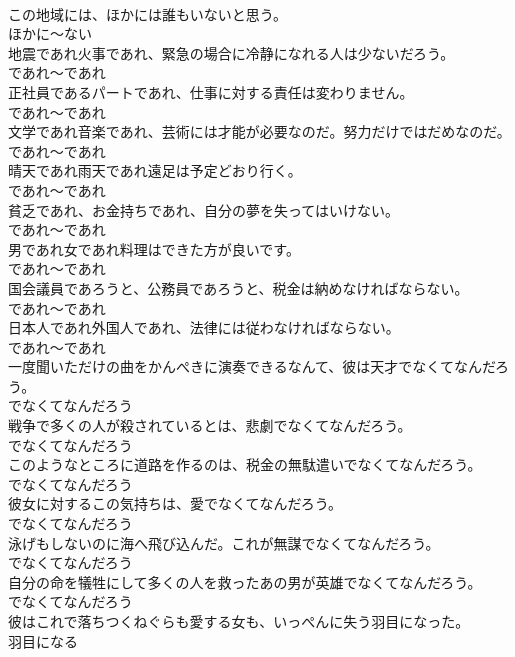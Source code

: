 \documentclass[8pt]{extreport}
\begin{document}
\begin{CJK}{UTF8}{min}
\\	この地域には、ほかには誰もいないと思う。	
\\	ほかに～ない
\\	地震であれ火事であれ、緊急の場合に冷静になれる人は少ないだろう。	
\\	であれ～であれ
\\	正社員であるパートであれ、仕事に対する責任は変わりません。	
\\	であれ～であれ
\\	文学であれ音楽であれ、芸術には才能が必要なのだ。努力だけではだめなのだ。	
\\	であれ～であれ
\\	晴天であれ雨天であれ遠足は予定どおり行く。	
\\	であれ～であれ
\\	貧乏であれ、お金持ちであれ、自分の夢を失ってはいけない。	
\\	であれ～であれ
\\	男であれ女であれ料理はできた方が良いです。	
\\	であれ～であれ
\\	国会議員であろうと、公務員であろうと、税金は納めなければならない。	
\\	であれ～であれ
\\	日本人であれ外国人であれ、法律には従わなければならない。	
\\	であれ～であれ
\\	一度聞いただけの曲をかんぺきに演奏できるなんて、彼は天才でなくてなんだろう。	
\\	でなくてなんだろう
\\	戦争で多くの人が殺されているとは、悲劇でなくてなんだろう。	
\\	でなくてなんだろう
\\	このようなところに道路を作るのは、税金の無駄遣いでなくてなんだろう。	
\\	でなくてなんだろう
\\	彼女に対するこの気持ちは、愛でなくてなんだろう。	
\\	でなくてなんだろう
\\	泳げもしないのに海へ飛び込んだ。これが無謀でなくてなんだろう。	
\\	でなくてなんだろう
\\	自分の命を犠牲にして多くの人を救ったあの男が英雄でなくてなんだろう。	
\\	でなくてなんだろう
\\	彼はこれで落ちつくねぐらも愛する女も、いっぺんに失う羽目になった。	
\\	羽目になる

\end{CJK}
\end{document}
